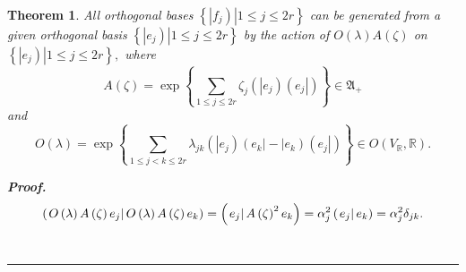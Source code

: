 \documentclass[aps,preprint]{revtex4}
\newtheorem{theorem}{Theorem}
\newenvironment{proof}[1][Proof]{\noindent\textbf{#1.} }{\ \rule{0.5em}{0.5em}}
\begin{document}
\begin{theorem}
All orthogonal bases $\left\{ \left. \left\vert f_{j}\right) \right\vert
1\leq j\leq 2r\right\} $ can be generated from a given orthogonal basis $%
\left\{ \left. \left\vert e_{j}\right) \right\vert 1\leq j\leq 2r\right\} $
by the action of $O\left( \mathbb{\lambda }\right) A\left( \mathbb{\zeta }%
\right) $ on $\left\{ \left. \left\vert e_{j}\right) \right\vert 1\leq j\leq
2r\right\} ,$ where%
\begin{equation}
A\left( \mathbb{\zeta }\right) =\exp \left\{ \sum_{1\leq j\leq 2r}\zeta
_{j}\left( \left\vert e_{j}\right) \left( e_{j}\right\vert \right) \right\}
\in \mathfrak{A}_{+}
\end{equation}%
and 
\begin{equation}
O\left( \mathbb{\lambda }\right) =\exp \left\{ \sum_{1\leq j<k\leq
2r}\lambda _{jk}\left( \left\vert e_{j}\right) \left( e_{k}\right\vert
-\left\vert e_{k}\right) \left( e_{j}\right\vert \right) \right\} \in
O\left( V_{\mathbb{R}},\mathbb{R}\right) .
\end{equation}

\begin{proof}
\begin{equation}
\left( \left. O\left( \mathbb{\lambda }\right) A\left( \mathbb{\zeta }%
\right) e_{j}\right\vert O\left( \mathbb{\lambda }\right) A\left( \mathbb{%
\zeta }\right) e_{k}\right) =\left( \left. e_{j}\right\vert A\left( \mathbb{%
\zeta }\right) ^{2}e_{k}\right) =\alpha _{j}^{2}\left( \left.
e_{j}\right\vert e_{k}\right) =\alpha _{j}^{2}\delta _{jk}.
\end{equation}
\end{proof}
\end{theorem}
\end{document}
